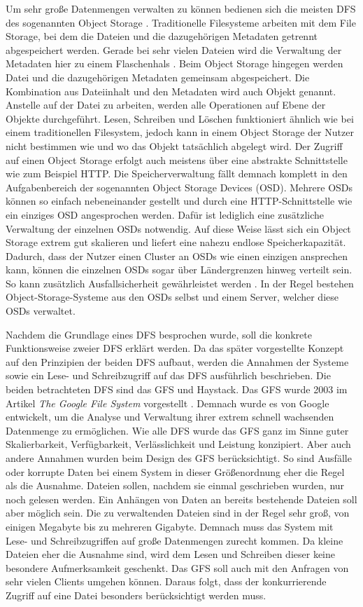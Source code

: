 \documentclass[12pt,oneside,a4paper,parskip]{scrbook}
\begin{document}
Um sehr große Datenmengen verwalten zu können bedienen sich die meisten DFS des sogenannten Object Storage \cite{cephPaper}. Traditionelle Filesysteme arbeiten mit dem File Storage, bei dem die Dateien und die dazugehörigen Metadaten getrennt abgespeichert werden. Gerade bei sehr vielen Dateien wird die Verwaltung der Metadaten hier zu einem Flaschenhals \cite{filestorage}. Beim Object Storage hingegen werden Datei und die dazugehörigen Metadaten gemeinsam abgespeichert. Die Kombination aus Dateiinhalt und den Metadaten wird auch Objekt genannt. Anstelle auf der Datei zu arbeiten, werden alle Operationen auf Ebene der Objekte durchgeführt. Lesen, Schreiben und Löschen funktioniert ähnlich wie bei einem traditionellen Filesystem, jedoch kann in einem Object Storage der Nutzer nicht bestimmen wie und wo das Objekt tatsächlich abgelegt wird. Der Zugriff auf einen Object Storage erfolgt auch meistens über eine abstrakte Schnittstelle wie zum Beispiel HTTP. Die Speicherverwaltung fällt demnach komplett in den Aufgabenbereich der sogenannten Object Storage Devices (OSD). Mehrere OSDs können so einfach nebeneinander gestellt und durch eine HTTP-Schnittstelle wie ein einziges OSD angesprochen werden. Dafür ist lediglich eine zusätzliche Verwaltung der einzelnen OSDs notwendig. Auf diese Weise lässt sich ein Object Storage extrem gut skalieren und liefert eine nahezu endlose Speicherkapazität. Dadurch, dass der Nutzer einen Cluster an OSDs wie einen einzigen ansprechen kann, können die einzelnen OSDs sogar über Ländergrenzen hinweg verteilt sein. So kann zusätzlich Ausfallsicherheit gewährleistet werden \cite{osvideo}\cite{objectstorage}\cite{objectBasedStorage}. In der Regel bestehen Object-Storage-Systeme aus den OSDs selbst und einem Server, welcher diese OSDs verwaltet.

Nachdem die Grundlage eines DFS besprochen wurde, soll die konkrete Funktionsweise zweier DFS erklärt werden. Da das später vorgestellte Konzept auf den Prinzipien der beiden DFS aufbaut, werden die Annahmen der Systeme sowie ein Lese- und Schreibzugriff auf das DFS ausführlich beschrieben. Die beiden betrachteten DFS sind das GFS und Haystack.
Das GFS wurde 2003 im Artikel \textit{The Google File System} vorgestellt \cite{GFS}. Demnach wurde es von Google entwickelt, um die Analyse und Verwaltung ihrer extrem schnell wachsenden Datenmenge zu ermöglichen. Wie alle DFS wurde das GFS ganz im Sinne guter Skalierbarkeit, Verfügbarkeit, Verlässlichkeit und Leistung konzipiert. Aber auch andere Annahmen wurden beim Design des GFS berücksichtigt. So sind Ausfälle oder korrupte Daten bei einem System in dieser Größenordnung eher die Regel als die Ausnahme. Dateien sollen, nachdem sie einmal geschrieben wurden, nur noch gelesen werden. Ein Anhängen von Daten an bereits bestehende Dateien soll aber möglich sein. Die zu verwaltenden Dateien sind in der Regel sehr groß, von einigen Megabyte bis zu mehreren Gigabyte. Demnach muss das System mit Lese- und Schreibzugriffen auf große Datenmengen zurecht kommen. Da kleine Dateien eher die Ausnahme sind, wird dem Lesen und Schreiben dieser keine besondere Aufmerksamkeit geschenkt. Das GFS soll auch mit den Anfragen von sehr vielen Clients umgehen können. Daraus folgt, dass der konkurrierende Zugriff auf eine Datei besonders berücksichtigt werden muss.  
\end{document}
